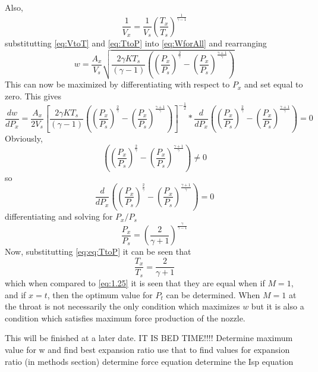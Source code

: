 Also,
\begin{equation}\label{eq:VtoT}
\frac{1}{V_x}=\frac{1}{V_s}\left(\frac{T_x}{T_s}\right)^{\frac{1}{\gamma-1}}
\end{equation}
substitutting \ref{eq:VtoT} and \ref{eq:TtoP} into \ref{eq:WforAll} and rearranging
\begin{equation}\label{eq:diffW}
w=\frac{A_x}{V_s}\sqrt{\frac{2\gamma KT_s}{(\gamma-1)}\left(\left(\frac{P_x}{P_s}\right)^{\frac{2}{\gamma}}-\left(\frac{P_x}{P_s}\right)^{\frac{\gamma+1}{\gamma}}\right)}
\end{equation}
This can now be maximized by differentiating with respect to $P_x$ and set equal to zero. This gives
\begin{equation}
\frac{dw}{dP_x}=\frac{A_x}{2V_s}\left[\frac{2\gamma KT_s}{(\gamma-1)}\left(\left(\frac{P_x}{P_s}\right)^{\frac{2}{\gamma}}-\left(\frac{P_x}{P_s}\right)^{\frac{\gamma+1}{\gamma}}\right)\right]^{-\frac{1}{2}}*\frac{d}{dP_x}\left(\left(\frac{P_x}{P_s}\right)^{\frac{2}{\gamma}}-\left(\frac{P_x}{P_s}\right)^{\frac{\gamma+1}{\gamma}}\right)=0
\end{equation}
Obviously, 
\begin{equation}
\left(\left(\frac{P_x}{P_s}\right)^{\frac{2}{\gamma}}-\left(\frac{P_x}{P_s}\right)^{\frac{\gamma+1}{\gamma}}\right)\neq0
\end{equation}
so
\begin{equation}
\frac{d}{dP_x}\left(\left(\frac{P_x}{P_s}\right)^{\frac{2}{\gamma}}-\left(\frac{P_x}{P_s}\right)^{\frac{\gamma+1}{\gamma}}\right)=0
\end{equation}
differentiating and solving for $P_x/P_s$
\begin{equation}
\frac{P_x}{P_s}=\left(\frac{2}{\gamma+1}\right)^{\frac{\gamma}{\gamma-1}}
\end{equation}
Now, substitutting \ref{eq:eq:TtoP} it can be seen that
\begin{equation}
\frac{T_x}{T_s}=\frac{2}{\gamma+1}
\end{equation}
which when compared to \ref{eq:1.25} it is seen that they are equal when 
if $M=1$, and if $x=t$, then the optimum value for $P_t$ can be determined. When $M=1$ at the throat is not necessarily the only condition which maximizes $w$ but it is also a condition which satisfies maximum force production of the nozzle.

This will be finished at a later date. IT IS BED TIME!!!!
Determine maximum value for w and find best expansion ratio
use that to find values for expansion ratio (in methods section)
determine force equation
determine the Isp equation


